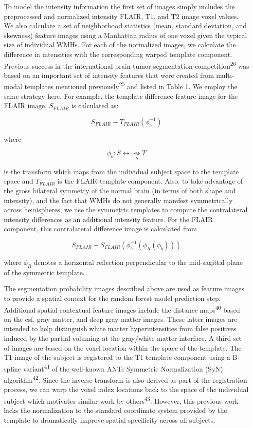 \documentclass[11pt,]{article}
\begin{document}
To model the intensity information the first set of images simply
includes the preprocessed and normalized intensity FLAIR, T1, and T2
image voxel values. We also calculate a set of neighborhood statistics
(mean, standard deviation, and skewness) feature images using a
Manhattan radius of one voxel given the typical size of individual WMHs.
For each of the normalized images, we calculate the difference in
intensities with the corresponding warped template component. Previous
success in the international brain tumor segmentation
competition\textsuperscript{26} was based on an important set of
intensity features that were created from multi-modal templates
mentioned previously\textsuperscript{25} and listed in Table 1. We
employ the same strategy here. For example, the template difference
feature image for the FLAIR image, \(S_{FLAIR}\) is calculated as:

\[S_{FLAIR} - T_{FLAIR}\left(\phi_b^{-1}\right)\]

where

\[\phi_b: S  \leftrightarrow \underset{b}{\leftrightsquigarrow} T\]

is the transform which maps from the individual subject space to the
template space and \(T_{FLAIR}\) is the FLAIR template component. Also,
to take advantage of the gross bilateral symmetry of the normal brain
(in terms of both shape and intensity), and the fact that WMHs do not
generally manifest symmetrically across hemispheres, we use the
symmetric templates to compute the contralateral intensity differences
as an additional intensity feature. For the FLAIR component, this
contralateral difference image is calculated from

\[S_{FLAIR} - S_{FLAIR}\left(\phi_b^{-1}\left(\phi_R\left(\phi_b\right)\right)\right)\]

where \(\phi_R\) denotes a horizontal reflection perpendicular to the
mid-sagittal plane of the symmetric template.

The segmentation probability images described above are used as feature
images to provide a spatial context for the random forest model
prediction step. Additional spatial contextual feature images include
the distance maps\textsuperscript{40} based on the csf, gray matter, and
deep gray matter images. These latter images are intended to help
distinguish white matter hyperintensities from false positives induced
by the partial voluming at the gray/white matter interface. A third set
of images are based on the voxel location within the space of the
template. The T1 image of the subject is registered to the T1 template
component using a B-spline variant\textsuperscript{41} of the well-known
ANTs Symmetric Normalization (SyN) algorithm\textsuperscript{42}. Since
the inverse transform is also derived as part of the registration
process, we can warp the voxel index locations back to the space of the
individual subject which motivates similar work by
others\textsuperscript{43}. However, this previous work lacks the
normalization to the standard coordinate system provided by the template
to dramatically improve spatial specificity across all subjects.
\end{document}
